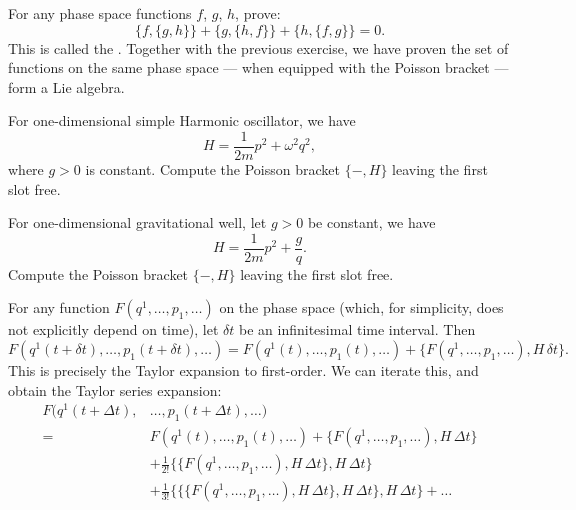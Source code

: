 \begin{exercise}
For any phase space functions $f$, $g$, $h$, prove:
\begin{equation*}
\{f,\{g,h\}\} + \{g,\{h,f\}\} + \{h,\{f,g\}\} = 0.
\end{equation*}
This is called the . Together with the previous
exercise, we have proven the set of functions on the same phase space
--- when equipped with the Poisson bracket --- form a Lie algebra.
\end{exercise}

\begin{exercise}
  For one-dimensional simple Harmonic oscillator, we have
  \begin{equation}
H = \frac{1}{2m}p^{2} + \omega^{2}q^{2},
  \end{equation}
  where $g>0$ is constant.
Compute the Poisson bracket $\{-,H\}$ leaving the first slot free.
\end{exercise}

\begin{exercise}
  For one-dimensional gravitational well, let $g>0$ be constant, we have
  \begin{equation}
H = \frac{1}{2m}p^{2} + \frac{g}{q}.
  \end{equation}
Compute the Poisson bracket $\{-,H\}$ leaving the first slot free.
\end{exercise}

For any function $F(q^{1},\dots,p_{1},\dots)$ on the phase space (which,
for simplicity, does not explicitly depend on time), let $\delta t$ be
an infinitesimal time interval. Then
\begin{equation}
F(q^{1}(t+\delta t),\dots,p_{1}(t+\delta t),\dots)
= F(q^{1}(t),\dots,p_{1}(t),\dots)
+ \{F(q^{1},\dots,p_{1},\dots),H\,\delta t\}.
\end{equation}
This is precisely the Taylor expansion to first-order. We can iterate
this, and obtain the Taylor series expansion:
\begin{equation}
\begin{aligned}
F(q^{1}(t+\Delta t),&\dots,p_{1}(t+\Delta t),\dots)\\
=~&F(q^{1}(t),\dots,p_{1}(t),\dots)
+ \{F(q^{1},\dots,p_{1},\dots),H\,\Delta t\}\\
&+ \frac{1}{2!}\{\{F(q^{1},\dots,p_{1},\dots),H\,\Delta t\},H\,\Delta t\}\\
&+ \frac{1}{3!}\{\{\{F(q^{1},\dots,p_{1},\dots),H\,\Delta t\},H\,\Delta t\},H\,\Delta t\}+\dots
\end{aligned}
\end{equation}

